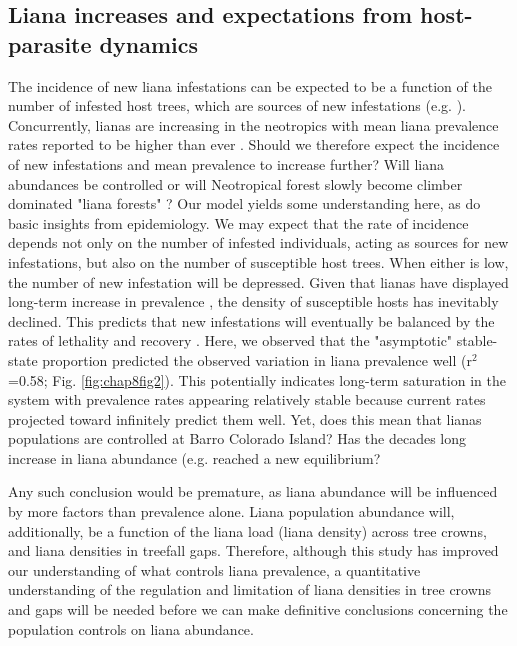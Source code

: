 \documentclass[b5paper,justified]{tufte-book} %
\begin{document}
\begin{fullwidth}
\subsection{Liana increases and expectations from host-parasite dynamics}
The incidence of new liana infestations can be expected to be a function of the number of infested host trees, which are sources of new infestations (e.g. \citealt{Muller-Landau2016}). Concurrently, lianas are increasing in the neotropics with mean liana prevalence rates reported to be higher than ever \citep{Wright2004a, Wright2015, Schnitzer2011}.  Should we therefore expect the incidence of new infestations and mean prevalence to increase further? Will liana abundances be controlled or will Neotropical forest slowly become climber dominated "liana forests" \citep{Perez-Salicrup2001}? Our model yields some understanding here, as do basic insights from epidemiology. 
 We may expect that the rate of incidence depends not only on the number of infested individuals, acting as sources for new infestations, but also on the number of susceptible host trees. When either is low, the number of new infestation will be depressed. Given that lianas have displayed long-term increase in prevalence \citep{Ingwell2010}, the density of susceptible hosts has inevitably declined. This predicts that new infestations will eventually be balanced by the rates of lethality and recovery \citep{Anderson1982}.  Here, we observed that the "asymptotic" stable-state proportion predicted the observed variation in liana prevalence well (r$^2$=0.58; Fig. \ref{fig:chap8fig2}). This potentially indicates long-term saturation in the system with prevalence rates appearing relatively stable because current rates projected toward infinitely predict them well. Yet, does this mean that lianas populations are controlled at Barro Colorado Island? Has the decades long increase in liana abundance (e.g. \citep{Wright2004a} reached a new equilibrium?  
 
Any such conclusion would be premature, as liana abundance will be influenced by more factors than prevalence alone. Liana population abundance will, additionally, be a function of the liana load (liana density) across tree crowns, and liana densities in treefall gaps. Therefore, although this study has improved our understanding of what controls liana prevalence, a quantitative understanding of the regulation and limitation of liana densities in tree crowns and gaps will be needed before we can make definitive conclusions concerning the population controls on liana abundance. 
 

\end{fullwidth}
\end{document}

